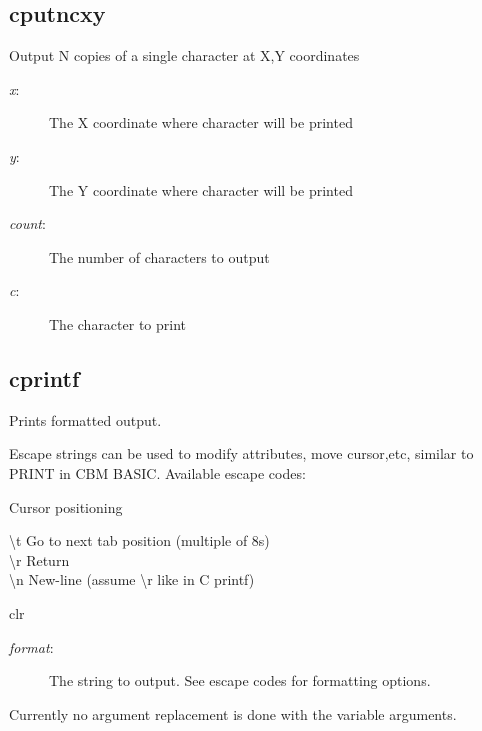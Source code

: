 \subsection{cputncxy}
\begin{description}[leftmargin=2cm,style=nextline]
\item [Description:] {Output N copies of a single character at X,Y coordinates}
\item [Syntax:] 
\item [Parameters:]
\begin{description}\item[]
\item [{\em x}:] {The X coordinate where character will be printed}
\item [{\em y}:] {The Y coordinate where character will be printed}
\item [{\em count}:] {The number of characters to output}
\item [{\em c}:] {The character to print}
\end{description}
\end{description}

\subsection{cprintf}
\begin{description}[leftmargin=2cm,style=nextline]
\item [Description:] {Prints formatted output.

    Escape strings can be used to modify attributes, move cursor,etc,
    similar to PRINT in CBM BASIC. Available escape codes:

    Cursor positioning

    {\textbackslash}t Go to next tab position (multiple of 8s) \\
    {\textbackslash}r Return                                   \\
    {\textbackslash}n New-line (assume {\textbackslash}r like in C printf)

    {clr}
}
\item [Syntax:] 
\item [Parameters:]
\begin{description}\item[]
\item [{\em format}:] {The string to output. See escape codes for formatting options.}
\end{description}
\item [Notes:] {Currently no argument replacement is done with the variable arguments.}
\end{description}

